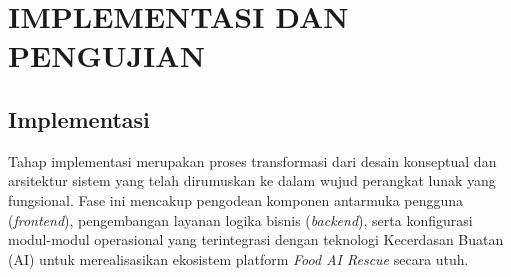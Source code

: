 \chapter{IMPLEMENTASI DAN PENGUJIAN}
\label{chapter:IMPLEMENTASI DAN PENGUJIAN}
\section{Implementasi}

Tahap implementasi merupakan proses transformasi dari desain konseptual dan arsitektur sistem yang telah dirumuskan ke dalam wujud perangkat lunak yang fungsional. Fase ini mencakup pengodean komponen antarmuka pengguna (\textit{frontend}), pengembangan layanan logika bisnis (\textit{backend}), serta konfigurasi modul-modul operasional yang terintegrasi dengan teknologi Kecerdasan Buatan (AI) untuk merealisasikan ekosistem platform \textit{Food AI Rescue} secara utuh.

